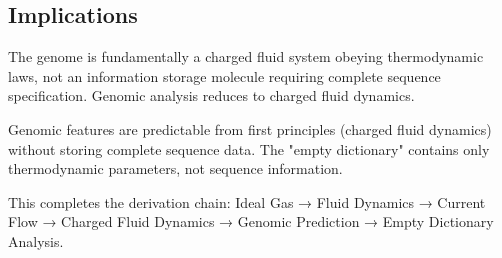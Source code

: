\subsection{Implications}

\begin{corollary}
\label{cor:genome_physical}
The genome is fundamentally a charged fluid system obeying thermodynamic laws, not an information storage molecule requiring complete sequence specification. Genomic analysis reduces to charged fluid dynamics.
\end{corollary}

\begin{corollary}
\label{cor:prediction_without_data}
Genomic features are predictable from first principles (charged fluid dynamics) without storing complete sequence data. The "empty dictionary" contains only thermodynamic parameters, not sequence information.
\end{corollary}

This completes the derivation chain: Ideal Gas → Fluid Dynamics → Current Flow → Charged Fluid Dynamics → Genomic Prediction → Empty Dictionary Analysis.
